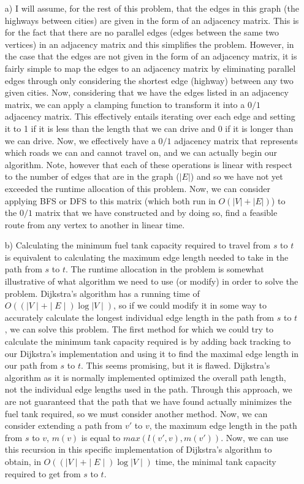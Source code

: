 \documentclass{article}
\begin{document}
\begin{solution}
\begin{itemize}
	\item[a)]{} I will assume, for the rest of this problem, that the edges in this graph (the highways between cities) are given in the form of an adjacency matrix.  This is for the fact that there are no parallel edges (edges between the same two vertices) in an adjacency matrix and this simplifies the problem.  However, in the case that the edges are not given in the form of an adjacency matrix, it is fairly simple to map the edges to an adjacency matrix by eliminating parallel edges through only considering the shortest edge (highway) between any two given cities.  Now, considering that we have the edges listed in an adjacency matrix, we can apply a clamping function to transform it into a $0/1$ adjacency matrix.  This effectively entails iterating over each edge and setting it to 1 if it is less than the length that we can drive and 0 if it is longer than we can drive.  Now, we effectively have a $0/1$ adjacency matrix that represents which roads we can and cannot travel on, and we can actually begin our algorithm. Note, however that each of these operations is linear with respect to the number of edges that are in the graph ($|E|$) and so we have not yet exceeded the runtime allocation of this problem.  Now, we can consider applying BFS or DFS to this matrix (which both run in $O(|V|+|E|)$) to the $0/1$ matrix that we have constructed and by doing so, find a feasible route from any vertex to another in linear time.
	\item[b)]{} Calculating the minimum fuel tank capacity required to travel from $s$ to $t$ is equivalent to calculating the maximum edge length needed to take in the path from $s$ to $t$.  The runtime allocation in the problem is somewhat illustrative of what algorithm we need to use (or modify) in order to solve the problem.  Dijkstra's algorithm has a running time of $O((\mid V \mid + \mid E \mid) \log {\mid V \mid})$, so if we could modify it in some way to accurately calculate the longest individual edge length in the path from $s$ to $t$, we can solve this problem.  The first method for which we could try to calculate the minimum tank capacity required is by adding back tracking to our Dijkstra's implementation and using it to find the maximal edge length in our path from $s$ to $t$.  This seems promising, but it is flawed.  Dijkstra's algorithm as it is normally implemented optimized the overall path length, not the individual edge lengths used in the path.  Through this approach, we are not guaranteed that the path that we have found actually minimizes the fuel tank required, so we must consider another method.  Now, we can consider extending a path from $v'$ to $v$, the maximum edge length in the path from $s$ to $v$, $m(v)$ is equal to $max(l(v',v),m(v'))$.  Now, we can use this recursion in this specific implementation of Dijkstra's algorithm to obtain, in $O((\mid V \mid + \mid E \mid) \log {\mid V \mid})$ time, the minimal tank capacity required to get from $s$ to $t$.
\end{itemize}
\end{solution}
\end{document}
